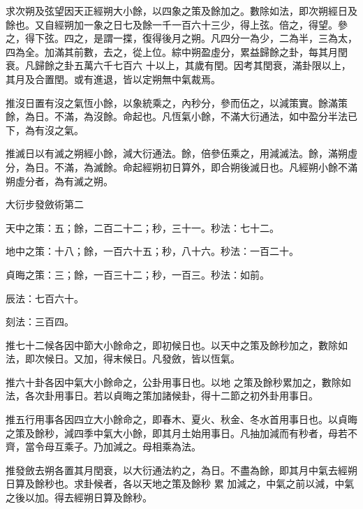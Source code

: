 \begin{pinyinscope}
 求次朔及弦望因天正經朔大小餘，以四象之策及餘加之。數除如法，即次朔經日及餘也。又自經朔加一象之日七及餘一千一百六十三少，得上弦。倍之，得望。參之，得下弦。四之，是謂一揲，復得後月之朔。凡四分一為少，二為半，三為太，四為全。加滿其前數，去之，從上位。綜中朔盈虛分，累益歸餘之卦，每其月閏衰。凡歸餘之卦五萬六千七百六
 十以上，其歲有閏。因考其閏衰，滿卦限以上，其月及合置閏。或有進退，皆以定朔無中氣裁焉。



 推沒日置有沒之氣恆小餘，以象統乘之，內秒分，參而伍之，以減策實。餘滿策餘，為日。不滿，為沒餘。命起也。凡恆氣小餘，不滿大衍通法，如中盈分半法已下，為有沒之氣。



 推滅日以有滅之朔經小餘，減大衍通法。餘，倍參伍乘之，用減滅法。餘，滿朔虛分，為日。不滿，為滅餘。命起經朔初日算外，即合朔後滅日也。凡經朔小餘不滿朔虛分者，為有滅之朔。



 大衍步發斂術第二



 天中之策：五；餘，二百二十二；秒，三十一。秒法：七十二。



 地中之策：十八；餘，一百六十五；秒，八十六。秒法：一百二十。



 貞晦之策：三；餘，一百三十二；秒，一百三。秒法：如前。



 辰法：七百六十。



 刻法：三百四。



 推七十二候各因中節大小餘命之，即初候日也。以天中之策及餘秒加之，數除如法，即次候日。又加，得末候日。凡發斂，皆以恆氣。



 推六十卦各因中氣大小餘命之，公卦用事日也。以地
 之策及餘秒累加之，數除如法，各次卦用事日。若以貞晦之策加諸候卦，得十二節之初外卦用事日。



 推五行用事各因四立大小餘命之，即春木、夏火、秋金、冬水首用事日也。以貞晦之策及餘秒，減四季中氣大小餘，即其月土始用事日。凡抽加減而有秒者，母若不齊，當令母互乘子。乃加減之。母相乘為法。



 推發斂去朔各置其月閏衰，以大衍通法約之，為日。不盡為餘，即其月中氣去經朔日算及餘秒也。求卦候者，各以天地之策及餘秒
 累
 加減之，中氣之前以減，中氣之後以加。得去經朔日算及餘秒。




\end{pinyinscope}
